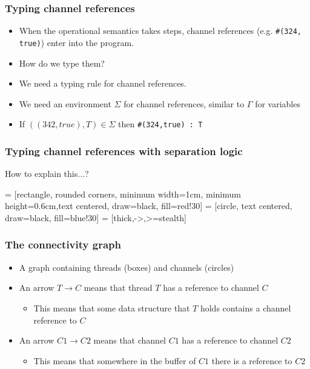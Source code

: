 \documentclass[aspectratio=169]{beamer}
\begin{document}
\begin{frame}[fragile]
  \frametitle{Typing channel references}
  \begin{itemize}
    \item When the operational semantics takes steps, channel references (e.g. \lstinline|#(324, true)|) enter into the program.
    \item How do we type them?
    \item We need a typing rule for channel references.
    \item We need an environment $\Sigma$ for channel references, similar to $\Gamma$ for variables
    \item If $((342,true), T) \in \Sigma$ then \lstinline|#(324,true) : T|
  \end{itemize}
\end{frame}

\begin{frame}[fragile]
  \frametitle{Typing channel references with separation logic}
  How to explain this...?
\end{frame}

 = [rectangle, rounded corners, minimum width=1cm, minimum height=0.6cm,text centered, draw=black, fill=red!30]
 = [circle, text centered, draw=black, fill=blue!30]
 = [thick,->,>=stealth]


\begin{frame}[fragile]
  \frametitle{The connectivity graph}
  \begin{itemize}
    \item A graph containing threads (boxes) and channels (circles)
    \item An arrow $T \to C$ means that thread $T$ has a reference to channel $C$
      \begin{itemize}
        \item This means that some data structure that $T$ holds contains a channel reference to $C$
      \end{itemize}
    \item An arrow $C1 \to C2$ means that channel $C1$ has a reference to channel $C2$
      \begin{itemize}
        \item This means that somewhere in the buffer of $C1$ there is a reference to $C2$
      \end{itemize}
  \end{itemize}
  \medskip

\end{frame}
\end{document}
